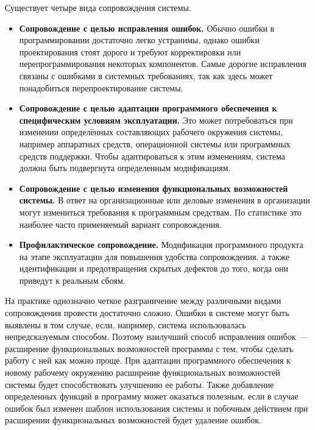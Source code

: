 \documentclass{../../text-style}
\begin{document}
Существует четыре вида сопровождения системы.

\begin{itemize}
    \item \textbf{Сопровождение с целью исправления ошибок.} Обычно ошибки в программировании достаточно легко устранимы, однако ошибки проектирования стоят дорого и требуют корректировки или перепрограммирования некоторых компонентов. Самые дорогие исправления связаны с ошибками в системных требованиях, так как здесь может понадобиться перепроектирование системы.
    \item \textbf{Сопровождение с целью адаптации программного обеспечения к специфическим условиям эксплуатации.} Это может потребоваться при изменении определённых составляющих рабочего окружения системы, например аппаратных средств, операционной системы или программных средств поддержки. Чтобы адаптироваться к этим изменениям, система должна быть подвергнута определенным модификациям.
    \item \textbf{Сопровождение с целью изменения функциональных возможностей системы.} В ответ на организационные или деловые изменения в организации могут измениться требования к программным средствам. По статистике это наиболее часто применяемый вариант сопровождения.
    \item \textbf{Профилактическое сопровождение.} Модификация программного продукта на этапе эксплуатации для повышения удобства сопровождения, а также идентификации и предотвращения скрытых дефектов до того, когда они приведут к реальным сбоям.
\end{itemize}

На практике однозначно четкое разграничение между различными видами сопровождения провести достаточно сложно. Ошибки в системе могут быть выявлены в том случае, если, например, система использовалась непредсказуемым способом. Поэтому наилучший способ исправления ошибок~--- расширение функциональных возможностей программы с тем, чтобы сделать работу с ней как можно проще. При адаптации программного обеспечения к новому рабочему окружению расширение функциональных возможностей системы будет способствовать улучшению ее работы. Также добавление определенных функций в программу может оказаться полезным, если в случае ошибок был изменен шаблон использования системы и побочным действием при расширении функциональных возможностей будет удаление ошибок.
\end{document}
